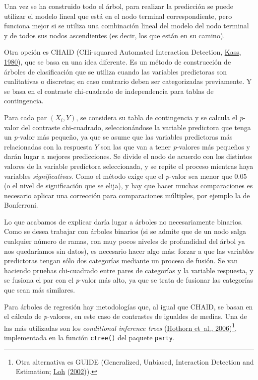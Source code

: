 \documentclass[
  spanish,
]{book}
\theoremstyle{break}
\theoremstyle{definition}
\theoremstyle{definition}
\theoremstyle{definition}
\theoremstyle{definition}
\theoremstyle{remark}
\begin{document}
Una vez se ha construido todo el árbol, para realizar la predicción se puede utilizar el modelo lineal que está en el nodo terminal correspondiente, pero funciona mejor si se utiliza una combinación lineal del modelo del nodo terminal y de todos sus nodos ascendientes (es decir, los que están en su camino).

Otra opción es CHAID (CHi-squared Automated Interaction Detection, \protect\hyperlink{ref-kass1980exploratory}{Kass, 1980}), que se basa en una idea diferente. Es un método de construcción de árboles de clasificación que se utiliza cuando las variables predictoras son cualitativas o discretas; en caso contrario deben ser categorizadas previamente.
Y se basa en el contraste chi-cuadrado de independencia para tablas de contingencia.

Para cada par \((X_i, Y)\), se considera su tabla de contingencia y se calcula el \emph{p}-valor del contraste chi-cuadrado, seleccionándose la variable predictora que tenga un \emph{p}-valor más pequeño, ya que se asume que las variables predictoras más relacionadas con la respuesta \(Y\) son las que van a tener \emph{p}-valores más pequeños y darán lugar a mejores predicciones.
Se divide el nodo de acuerdo con los distintos valores de la variable predictora seleccionada, y se repite el proceso mientras haya variables \emph{significativas}.
Como el método exige que el \emph{p}-valor sea menor que 0.05 (o el nivel de significación que se elija), y hay que hacer muchas comparaciones es necesario aplicar una corrección para comparaciones múltiples, por ejemplo la de Bonferroni.

Lo que acabamos de explicar daría lugar a árboles no necesariamente binarios.
Como se desea trabajar con árboles binarios (si se admite que de un nodo salga cualquier número de ramas, con muy pocos niveles de profundidad del árbol ya nos quedaríamos sin datos), es necesario hacer algo más: forzar a que las variables predictoras tengan sólo dos categorías mediante un proceso de fusión.
Se van haciendo pruebas chi-cuadrado entre pares de categorías y la variable respuesta, y se fusiona el par con el \emph{p}-valor más alto, ya que se trata de fusionar las categorías que sean más similares.

Para árboles de regresión hay metodologías que, al igual que CHAID, se basan en el cálculo de \emph{p}-valores, en este caso de contrastes de igualdes de medias.
Una de las más utilizadas son los \emph{conditional inference trees} (\protect\hyperlink{ref-hothorn2006unbiased}{Hothorn et~al., 2006})\footnote{Otra alternativa es GUIDE (Generalized, Unbiased, Interaction Detection and Estimation; \protect\hyperlink{ref-loh2002regression}{Loh} (\protect\hyperlink{ref-loh2002regression}{2002})).}, implementada en la función \texttt{ctree()} del paquete \href{https://CRAN.R-project.org/package=party}{\texttt{party}}.
\end{document}

